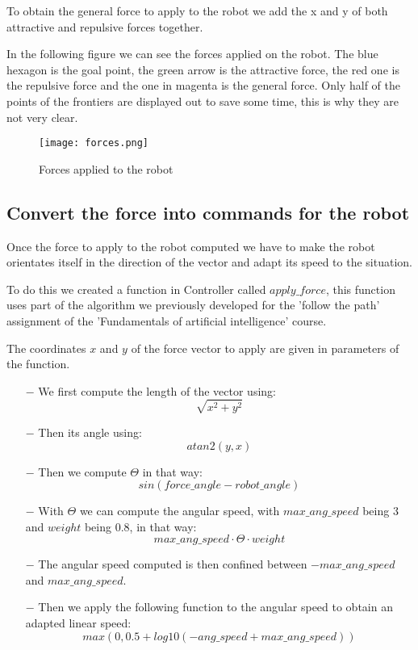 To obtain the general force to apply to the robot we add the x and y of both attractive and repulsive forces together.

In the following figure we can see the forces applied on the robot.
The blue hexagon is the goal point, the green arrow is the attractive force, the red one is the repulsive force and the one in magenta is the general force.
Only half of the points of the frontiers are displayed out to save some time, this is why they are not very clear.

\FloatBarrier
\begin{figure}
    \centering\texttt{[image: forces.png]}
    \label{fig:forces}
    \caption{Forces applied to the robot}
\end{figure}
\FloatBarrier

\subsection{Convert the force into commands for the robot}

Once the force to apply to the robot computed we have to make the robot orientates itself in the direction of the vector and adapt its speed to the situation.

To do this we created a function in Controller called $apply\_force$, this function uses part of the algorithm we previously developed for the 'follow the path' assignment of the 'Fundamentals of artificial intelligence' course.

The coordinates $x$ and $y$ of the force vector to apply are given in parameters of the function.

\begin{itemize}
    \item[$-$] We first compute the length of the vector using:
        $$\sqrt{x^2 + y^2}$$
    \item[$-$] Then its angle using:
        $$atan2(y, x)$$
    \item[$-$] Then we compute $\Theta$ in that way:
        $$sin(force\_angle - robot\_angle)$$
    \item[$-$] With $\Theta$ we can compute the angular speed, with $max\_ang\_speed$ being $3$ and $weight$ being $0.8$, in that way:
        $$max\_ang\_speed \cdot \Theta \cdot weight$$
    \item[$-$] The angular speed computed is then confined between $-max\_ang\_speed$ and $max\_ang\_speed$.
    \item[$-$] Then we apply the following function to the angular speed to obtain an adapted linear speed:
        $$max(0, 0.5 + log10(-ang\_speed + max\_ang\_speed))$$
\end{itemize}

